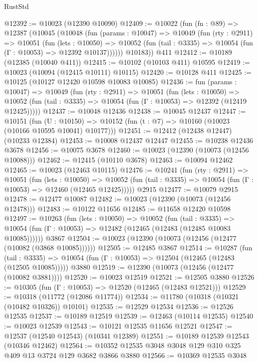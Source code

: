 \begin{lexlean}{RustStd}
\begin{coremodule}
@12392 := @10023 (@12390 @10090)
@12409 := @10022
    (fun (fn : @89) =>
    @12387
      (@10045
        (@10048
          (fun (params : @10047) =>
          @10049
            (fun (rty : @2911) =>
            @10051
              (fun (lets : @10050) =>
              @10052 (fun (tail : @3335) => @10054 (fun (Γ : @10053) => @12392 @10137))))))
        @10183))
    @411
@12412 := @10189 (@12385 (@10040 @411))
@12415 := @10102 (@10103 @411) @10595
@12419 := @10023 (@10094 (@12415 @10111) @10115)
@12420 := @10128 @411
@12425 := @10125 (@10127 @12420 @10598 @10083 @10085)
@12436 := fun (params : @10047) =>
  @10049
    (fun (rty : @2911) =>
    @10051
      (fun (lets : @10050) =>
      @10052 (fun (tail : @3335) => @10054 (fun (Γ : @10053) => @12392 (@12419 @12425)))))
@12437 := @10048 @12436
@12438 := @10045 @12437
@12447 := @10151
    (fun (U : @10150) => @10152 (fun (t : @7) => @10160 (@10023 (@10166 @10595 @10041) @10177)))
@12451 := @12412 (@12438 @12447) (@10233 @12384)
@12453 := @10008 @12437 @12447
@12455 := @10238 @12436 @3678
@12456 := @10075 @3678
@12460 := @10023 (@12390 (@10073 (@12456 @10088)))
@12462 := @12415 (@10110 @3678)
@12463 := @10094 @12462
@12465 := @10023 (@12463 @10115)
@12476 := @10241
    (fun (rty : @2911) =>
    @10051
      (fun (lets : @10050) =>
      @10052 (fun (tail : @3335) => @10054 (fun (Γ : @10053) => @12460 (@12465 @12425)))))
    @2915
@12477 := @10079 @2915
@12478 := @12477 @10087
@12482 := @10023 (@12390 (@10073 (@12456 @12478)))
@12483 := @10122 @11656
@12485 := @11658 @12420 @10598
@12497 := @10263
    (fun (lets : @10050) =>
    @10052
      (fun (tail : @3335) =>
      @10054 (fun (Γ : @10053) => @12482 (@12465 (@12483 (@12485 @10083 @10085))))))
    @3867
@12504 := @10023 (@12390 (@10073 (@12456 (@12477 (@10082 (@3868 @10085))))))
@12505 := @12485 @3867
@12514 := @10287
    (fun (tail : @3335) => @10054 (fun (Γ : @10053) => @12504 (@12465 (@12483 (@12505 @10085)))))
    @3880
@12519 := @12390 (@10073 (@12456 (@12477 (@10082 @3881))))
@12520 := @10023 @12519
@12521 := @12505 @3880
@12526 := @10305 (fun (Γ : @10053) => @12520 (@12465 (@12483 @12521)))
@12529 := @10318 (@11772 (@12086 @11774))
@12534 := @11780 (@10318 (@10321 (@10482 @10326)) @10101)
@12535 := @12529 @12534
@12536 := @12526 @12535
@12537 := @10189 @12519
@12539 := @12463 (@10114 @12535)
@12540 := @10023 @12539
@12543 := @10121 @12535 @11656 @12521
@12547 := @12537 (@12540 @12543) (@10341 @12389)
@12551 := @10189 @12539 @12543 (@10346 @12462)
@12564 := @10352 @12535 @3048 @3048 @129 @310 @325 @409 @13 @3724 @129 @3682 @3866 @3880
@12566 := @10369 @12535 @3048

\end{coremodule}
\end{lexlean}
